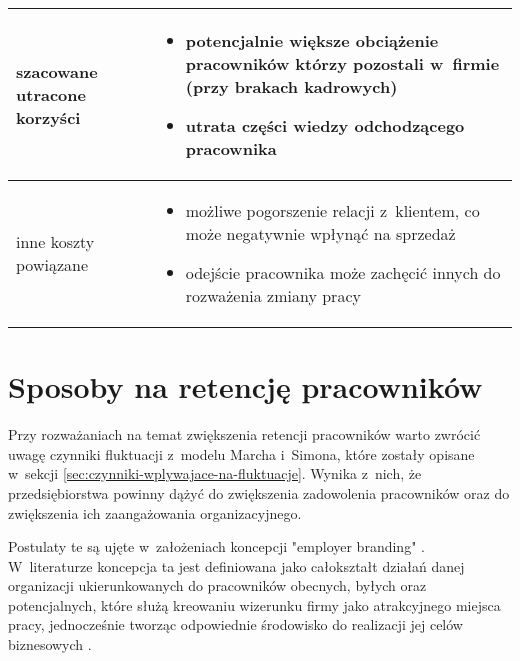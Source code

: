 \begin{minipage}{\textwidth}
\begin{table}[H]
\begin{center}
\begin{tabular}{|P{.15\textwidth}|P{.75\textwidth}|}
                         szacowane utracone korzyści &
                         \begin{itemize}
                             \item potencjalnie większe obciążenie pracowników którzy pozostali w~firmie (przy brakach kadrowych)
                             \item utrata części wiedzy odchodzącego pracownika
                         \end{itemize} \\
                         \hline

                         inne koszty powiązane &
                         \begin{itemize}
                             \item możliwe pogorszenie relacji z~klientem, co może negatywnie wpłynąć na sprzedaż
                             \item odejście pracownika może zachęcić innych do rozważenia zmiany pracy
                         \end{itemize} \\
                         \hline
                     \end{tabular}
                 \end{center}
                 \raggedright{}
                 \vspace{0.75cm}
             \end{table}
\end{minipage}


\section{Sposoby na retencję pracowników}\label{sec:retencja}

Przy rozważaniach na temat zwiększenia retencji pracowników warto zwrócić uwagę czynniki fluktuacji z~modelu Marcha i~Simona,
które zostały opisane w~sekcji \ref{sec:czynniki-wplywajace-na-fluktuacje}.
Wynika z~nich, że przedsiębiorstwa powinny dążyć do zwiększenia zadowolenia pracowników oraz do zwiększenia ich zaangażowania organizacyjnego.

Postulaty te są ujęte w~założeniach koncepcji "employer branding" \cite{spychala-2019}.
W~literaturze koncepcja ta jest definiowana jako
całokształt działań danej organizacji ukierunkowanych do pracowników obecnych, byłych oraz potencjalnych,
które służą kreowaniu wizerunku firmy jako atrakcyjnego miejsca pracy,
jednocześnie tworząc odpowiednie środowisko do realizacji jej celów biznesowych \cite{kozlowski-2012}.

